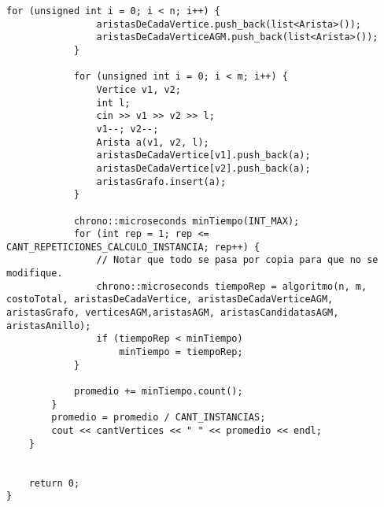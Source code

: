 \begin{lstlisting}[frame=single]
            for (unsigned int i = 0; i < n; i++) {
                aristasDeCadaVertice.push_back(list<Arista>());
                aristasDeCadaVerticeAGM.push_back(list<Arista>());
            }
            
            for (unsigned int i = 0; i < m; i++) {
                Vertice v1, v2;
                int l;
                cin >> v1 >> v2 >> l;
                v1--; v2--;
                Arista a(v1, v2, l);
                aristasDeCadaVertice[v1].push_back(a);
                aristasDeCadaVertice[v2].push_back(a);
                aristasGrafo.insert(a);
            }
            
            chrono::microseconds minTiempo(INT_MAX);
            for (int rep = 1; rep <= CANT_REPETICIONES_CALCULO_INSTANCIA; rep++) {
                // Notar que todo se pasa por copia para que no se modifique.
                chrono::microseconds tiempoRep = algoritmo(n, m, costoTotal, aristasDeCadaVertice, aristasDeCadaVerticeAGM, aristasGrafo, verticesAGM,aristasAGM, aristasCandidatasAGM, aristasAnillo);
                if (tiempoRep < minTiempo)
                    minTiempo = tiempoRep;
            }
            
            promedio += minTiempo.count();
        }
        promedio = promedio / CANT_INSTANCIAS;
        cout << cantVertices << " " << promedio << endl;
    }
    
    
    return 0;
}
\end{lstlisting}
